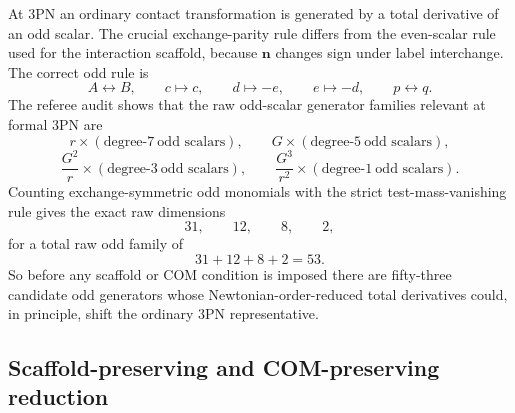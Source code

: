\documentclass[11pt]{article}
\begin{document}
At $3$PN an ordinary contact transformation is generated by a total derivative
of an odd scalar.  The crucial exchange-parity rule differs from the even-scalar
rule used for the interaction scaffold, because $\mathbf n$ changes sign under
label interchange.  The correct odd rule is
\begin{equation}
A\leftrightarrow B,
\qquad
c\mapsto c,
\qquad
d\mapsto -e,
\qquad
e\mapsto -d,
\qquad
p\leftrightarrow q.
\label{eq:app-gauge-orbit-odd-exchange}
\end{equation}
The referee audit shows that the raw odd-scalar generator families relevant at
formal $3$PN are
\begin{equation}
 r\times(\text{degree-}7\ \text{odd scalars}),
 \qquad
 G\times(\text{degree-}5\ \text{odd scalars}),
\label{eq:app-gauge-orbit-raw-families-1}
\end{equation}
\begin{equation}
 \frac{G^2}{r}\times(\text{degree-}3\ \text{odd scalars}),
 \qquad
 \frac{G^3}{r^2}\times(\text{degree-}1\ \text{odd scalars}).
\label{eq:app-gauge-orbit-raw-families-2}
\end{equation}
Counting exchange-symmetric odd monomials with the strict test-mass-vanishing
rule gives the exact raw dimensions
\begin{equation}
\boxed{31,
\qquad
12,
\qquad
8,
\qquad
2,}
\label{eq:app-gauge-orbit-raw-counts}
\end{equation}
for a total raw odd family of
\begin{equation}
\boxed{31+12+8+2=53.}
\label{eq:app-gauge-orbit-total-raw}
\end{equation}
So before any scaffold or COM condition is imposed there are fifty-three
candidate odd generators whose Newtonian-order-reduced total derivatives could,
in principle, shift the ordinary $3$PN representative.

\subsection{Scaffold-preserving and COM-preserving reduction}
\label{app:gauge-orbit-reduction}
\end{document}
